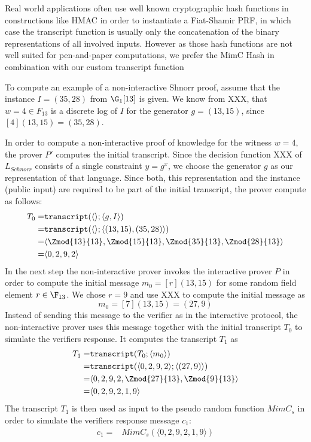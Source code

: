 \begin{example}
Real world applications often use well known cryptographic hash functions in constructions like HMAC in order to instantiate a Fiat-Shamir PRF, in which case the transcript function is usually only the concatenation of the binary representations of all involved inputs. However as those hash functions are not well suited for pen-and-paper computations, we prefer the MimC Hash in combination with our custom transcript function

To compute an example of a non-interactive Shnorr proof, assume that the instance $I=(35,28)$ from $\G_1[13]$ is given. We know from XXX, that $w=4\in F_{13}$ is a discrete log of $I$ for the generator $g=(13,15)$, since $[4](13,15)=(35,28)$. 

In order to compute a non-interactive proof of knowledge for the witness $w=4$, the prover $P'$ computes the initial transcript. Since the decision function XXX of $L_{Schnorr}$ consists of a single constraint $y=g^x$, we choose the generator $g$ as our representation of that language. Since both, this representation and the instance (public input) are required to be part of the initial transcript, the prover compute as follows:
\begin{align*}
T_0 = & \mathtt{transcript}(\langle\rangle; \langle g,I\rangle) \\
    = & \mathtt{transcript}(\langle\rangle; \langle(13,15),(35,28)\rangle) \\
    = & \langle \Zmod{13}{13}, \Zmod{15}{13},\Zmod{35}{13},\Zmod{28}{13} \rangle \\  
    = & \langle 0,2,9,2 \rangle
\end{align*}
In the next step the non-interactive prover invokes the interactive prover $P$ in order to compute the initial message $m_0=[r](13,15)$ for some random field element $r\in \F_{13}$. We chose $r=9$ and use XXX to compute the initial message as
$$
m_0 = [7](13,15) = (27,9)
$$
Instead of sending this message to the verifier as in the interactive protocol, the non-interactive prover uses this message together with the initial transcript $T_0$ to simulate the verifiers response. It computes the transcript $T_1$ as
\begin{align*}
T_1 = & \mathtt{transcript}(T_0; \langle m_0\rangle) \\
    = & \mathtt{transcript}(\langle 0,2,9,2\rangle; \langle(27,9)\rangle) \\
    = & \langle 0,2,9,2,\Zmod{27}{13},\Zmod{9}{13} \rangle \\  
    = & \langle 0,2,9,2,1,9 \rangle
\end{align*}
The transcript $T_1$ is then used as input to the pseudo random function $MimC_s$ in order to simulate the verifiers response message $c_1$:
\begin{align*}
c_1 = & MimC_s(\langle 0,2,9,2,1,9 \rangle)
\end{align*}
\end{example}


